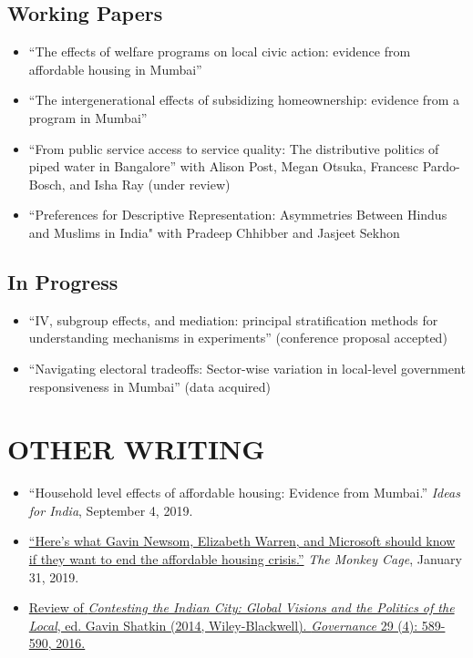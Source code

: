 \documentclass[11pt]{article}
\begin{document}
\subsection*{Working Papers}

\begin{itemize}
	\item[]``The effects of welfare programs on local civic action: evidence from affordable housing in Mumbai'' 
	\item[]``The intergenerational effects of subsidizing homeownership: evidence from a program in Mumbai'' 		\item[]``From public service access to service quality: The distributive politics of piped water in Bangalore'' with Alison Post, Megan Otsuka, Francesc Pardo-Bosch, and Isha Ray (under review)
	
		\item[]``Preferences for Descriptive Representation: Asymmetries Between Hindus and Muslims in India" with Pradeep Chhibber and Jasjeet Sekhon 
		\end{itemize}

\subsection*{In Progress}
\begin{itemize}
	\item[]``IV, subgroup effects, and mediation: principal stratification methods for understanding mechanisms in experiments'' (conference proposal accepted)
	\item[]``Navigating electoral tradeoffs: Sector-wise variation in local-level government responsiveness in Mumbai'' (data acquired)

	\end{itemize}
\vspace{3mm}
\section*{OTHER WRITING}
\begin{itemize}
\item[]``Household level effects of affordable housing: Evidence from Mumbai.'' \textit{Ideas for India}, September 4, 2019.
\item[]\href{https://www.washingtonpost.com/news/monkey-cage/wp/2019/01/31/heres-what-gavin-newsom-elizabeth-warren-and-microsoft-should-know-if-want-to-end-the-affordable-housing-crisis/?tid=sm_tw_cage}{``Here's what Gavin Newsom, Elizabeth Warren, and Microsoft should know if they want to end the affordable housing crisis.''} \textit{The Monkey Cage}, January 31, 2019.
\item[] \href{http://onlinelibrary.wiley.com/doi/10.1111/gove.12241/abstract}{Review of \textit{Contesting the Indian City: Global Visions and the Politics of the Local}, ed. Gavin Shatkin (2014, Wiley-Blackwell). \textit{Governance} 29 (4): 589-590, 2016.} \
\end{itemize}
\end{document}
